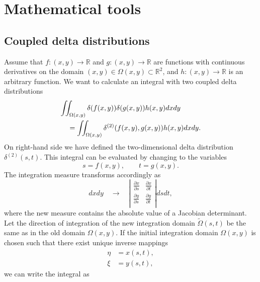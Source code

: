 \documentclass[a4paper,12pt]{report}
\begin{document}
\chapter{Mathematical tools} 

\section{Coupled delta distributions} \label{sec:coupled_delta}
Assume that $f:(x, y) \rightarrow \mathbb{R}$ and 
$g:(x, y) \rightarrow \mathbb{R}$ are functions with 
continuous derivatives on the domain 
$(x, y) \in \Omega(x,y) \subset \mathbb{R}^{2}$,
and $h:(x, y) \rightarrow \mathbb{R}$ is an arbitrary function. 
We want to calculate an integral with two coupled delta 
distributions
\begin{eqnarray}
  \lefteqn{ \iint_{\Omega(x,y)}\delta(f(x,y))
    \delta(g(x,y))h(x,y) dx dy } \nonumber \\
  & & {} =\iint_{\Omega(x,y)}\delta^{(2)}(f(x,y),g(x,y))
  h(x,y)dx dy. 
\end{eqnarray}
On right-hand side we have defined the two-dimensional 
delta distribution $\delta^{(2)}(s,t)$. This integral can 
be evaluated by changing to the variables
\begin{equation}
  s=f(x,y), \qquad t=g(x,y).  
\end{equation}
The integration measure transforms accordingly as \cite{callahan2010}
\begin{equation}
  dx dy \quad \longrightarrow \quad \left\vert \begin{array}{cc}
    \frac{\partial x}{\partial s} & \frac{\partial x}{\partial t} \\
    \frac{\partial y}{\partial s} & \frac{\partial y}{\partial t} \\
  \end{array} \right\vert ds dt,
\end{equation}
where the new measure contains the absolute value of a 
Jacobian determinant. Let the direction of integration of 
the new integration domain $\tilde{\Omega}(s,t)$ be the same 
as in the old domain $\Omega(x,y)$. If the initial integration 
domain $\Omega(x,y)$ is chosen such that there exist unique 
inverse mappings
\begin{align}
  \eta &=x(s,t), \nonumber \\
  \xi &=y(s,t), 
\end{align}
we can write the integral as
\end{document}
